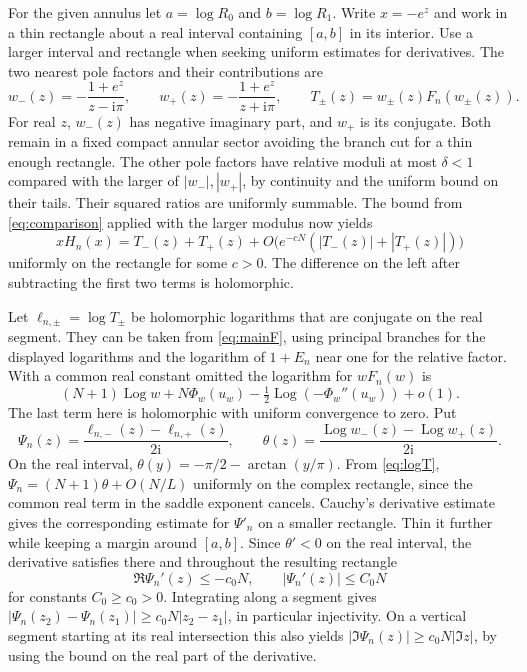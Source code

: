 \documentclass[11pt]{article}
\newcommand{\ii}{\mathrm i}
\newcommand{\Log}{\operatorname{Log}}
\begin{document}
For the given annulus let \(a=\log R_0\) and \(b=\log R_1\). Write \(x=-e^z\) and work in a thin rectangle about a real interval containing \([a,b]\) in its interior. Use a larger interval and rectangle when seeking uniform estimates for derivatives. The two nearest pole factors and their contributions are
\[
 w_-(z)=-\frac{1+e^z}{z-\ii\pi},\qquad
 w_+(z)=-\frac{1+e^z}{z+\ii\pi},\qquad
 T_\pm(z)=w_\pm(z)F_n(w_\pm(z)).
\]
For real \(z\), \(w_-(z)\) has negative imaginary part, and \(w_+\) is its conjugate. Both remain in a fixed compact annular sector avoiding the branch cut for a thin enough rectangle. The other pole factors have relative moduli at most \(\delta<1\) compared with the larger of \(|w_-|,|w_+|\), by continuity and the uniform bound on their tails. Their squared ratios are uniformly summable. The bound from \eqref{eq:comparison} applied with the larger modulus now yields
\begin{equation}\label{eq:twopole}
 xH_n(x)=T_-(z)+T_+(z)+O\bigl(e^{-cN}(|T_-(z)|+|T_+(z)|)\bigr)
\end{equation}
uniformly on the rectangle for some \(c>0\). The difference on the left after subtracting the first two terms is holomorphic.

Let \(\ell_{n,\pm}=\log T_\pm\) be holomorphic logarithms that are conjugate on the real segment. They can be taken from \eqref{eq:mainF}, using principal branches for the displayed logarithms and the logarithm of \(1+E_n\) near one for the relative factor. With a common real constant omitted the logarithm for \(wF_n(w)\) is
\begin{equation}\label{eq:logT}
 (N+1)\Log w+N\Phi_w(u_w)-\tfrac12\Log(-\Phi_w''(u_w))+o(1).
\end{equation}
The last term here is holomorphic with uniform convergence to zero. Put
\[
 \Psi_n(z)=\frac{\ell_{n,-}(z)-\ell_{n,+}(z)}{2\ii},\qquad
 \theta(z)=\frac{\Log w_-(z)-\Log w_+(z)}{2\ii}.
\]
On the real interval, \(\theta(y)=-\pi/2-\arctan(y/\pi)\). From \eqref{eq:logT}, \(\Psi_n=(N+1)\theta+O(N/L)\) uniformly on the complex rectangle, since the common real term in the saddle exponent cancels. Cauchy's derivative estimate gives the corresponding estimate for \(\Psi'_n\) on a smaller rectangle. Thin it further while keeping a margin around \([a,b]\). Since \(\theta'<0\) on the real interval, the derivative satisfies there and throughout the resulting rectangle
\begin{equation}\label{eq:derivatives}
 \Re\Psi_n'(z)\le-c_0N,\qquad |\Psi_n'(z)|\le C_0N
\end{equation}
for constants \(C_0\ge c_0>0\). Integrating along a segment gives \(|\Psi_n(z_2)-\Psi_n(z_1)|\ge c_0N|z_2-z_1|\), in particular injectivity. On a vertical segment starting at its real intersection this also yields \(|\Im\Psi_n(z)|\ge c_0N|\Im z|\), by using the bound on the real part of the derivative.
\end{document}
